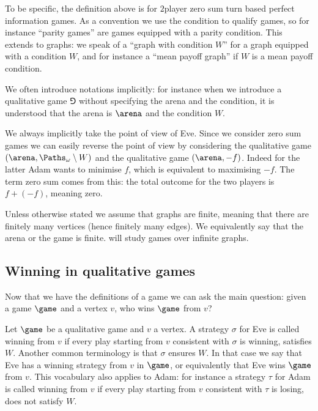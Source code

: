 \documentclass[letterpaper,10pt,english]{sphinxmanual}
\begin{document}
To be specific, the definition above is for \(2\)\sphinxhyphen{}player zero sum turn
based perfect information games. As a convention we use the condition to
qualify games, so for instance “parity games” are games equipped with a
parity condition. This extends to graphs: we speak of a “graph with
condition \(W\)” for a graph equipped with a condition \(W\), and for
instance a “mean payoff graph” if \(W\) is a mean payoff condition.

We often introduce notations implicitly: for instance when we introduce
a qualitative game \(\Game\) without specifying the arena and the
condition, it is understood that the arena is \(\arena\) and the condition
\(W\).

We always implicitly take the point of view of Eve. Since we consider
zero sum games we can easily reverse the point of view by considering
the qualitative game \((\arena,\Paths_\omega \setminus W)\) and the
qualitative game \((\arena,-f)\). Indeed for the latter Adam wants to
minimise \(f\), which is equivalent to maximising \(-f\). The term zero sum
comes from this: the total outcome for the two players is \(f + (-f)\),
meaning zero.

Unless otherwise stated we assume that graphs are finite, meaning that
there are finitely many vertices (hence finitely many edges). We
equivalently say that the arena or the game is finite. will study games
over infinite graphs.


\subsection{Winning in qualitative games}
\label{\detokenize{1_Introduction/simple:winning-in-qualitative-games}}\label{\detokenize{1_Introduction/simple:subsec-qualitative-games}}
Now that we have the definitions of a game we can ask the main question:
given a game \(\game\) and a vertex \(v\), who wins \(\game\) from \(v\)?

Let \(\game\) be a qualitative game and \(v\) a vertex. A strategy \(\sigma\)
for Eve is called winning from \(v\) if every play starting from
\(v\) consistent with \(\sigma\) is winning,  satisfies \(W\). Another
common terminology is that \(\sigma\) ensures \(W\). In that case we say
that Eve has a winning strategy from \(v\) in \(\game\), or equivalently
that Eve wins \(\game\) from \(v\). This vocabulary also applies to Adam:
for instance a strategy \(\tau\) for Adam is called winning from
\(v\) if every play starting from \(v\) consistent with \(\tau\) is losing,
 does not satisfy \(W\).
\end{document}
